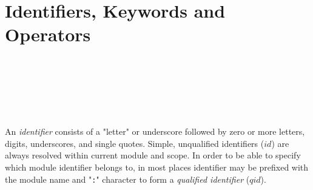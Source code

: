 \section{Identifiers, Keywords and Operators}

\begin{bnf}
    \eq {} \\
   \eq {} \ \term{:} \  \\
  \\
   \eq
        \gor   {}
        \gor   {}
        \gor   {}
        \gor   {}
        \gor   {}
        \gorln {}
        \gor   {}
        \gor   {}
        \gor   {}
        \gor   {}
        \gor   {}
        \gor   {}
        \gorln {}
        \gor   {}
        \gor   {}
        \gor   {}
        \gor   {}
        \gor   {}
        \gor   {}
        \gor   {}
        \gorln {}
        \gor   {}
        \gor   {}
        \gor   {}
        \gor   {}
        \gor   {}
        \gor   {}
        \gorln {}
        \gor   {}
        \gor   {}
        \gor   {}
        \gor   {}
        \gor   \term{\_} \\
  \\
   \eq
                \term{+}
         \gor   \term{-}
         \gor   \term{*}
         \gor   \term{/}
         \gorln \term{(}
         \gor   \term{)}
         \gor   \term{[}
         \gor   \term{]}
         \gor   \term{\{}
         \gor   \term{\}}
         \gor   \term{,}
         \gor   \term{:}
         \gor   \term{;}
         \gorln \term{==}
         \gor   \term{!=}
         \gor   \term{<}
         \gor   \term{<=}
         \gor   \term{>}
         \gor   \term{>=}
         \gor   \term{===}
         \gor   \term{!==}
         \gorln \term{=}
         \gor   \term{<-}
\end{bnf}

An \emph{identifier} consists of a "letter" or underscore followed by zero or more letters, digits, underscores, and single quotes. Simple, unqualified identifiers (\(id\)) are always resolved within current module and scope. In order to be able to specify which module identifier belongs to, in most places identifier may be prefixed with the module name and "\texttt{:}" character to form a \emph{qualified identifier} (\(qid\)).

